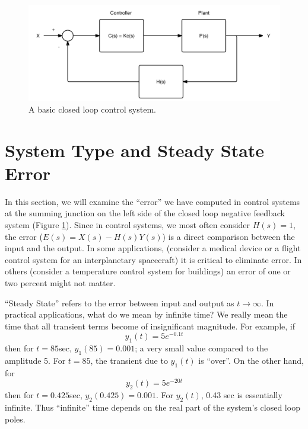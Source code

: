 \begin{figure}[b]\centering
\includegraphics[width=4.5in]{figs11/cl_rl_systema.png}	%
\caption{A basic closed loop control system.}\label{basicCLfig}
\end{figure}

%
%


\section{System Type and Steady State Error}

In this section, we will examine the ``error'' we have computed in control systems at the summing junction on the left side of the closed loop negative feedback system (Figure \ref{basicCLfig}).  Since in control systems, we most often consider $H(s) = 1$,  the error ($E(s) = X(s)-H(s)Y(s)$)
is a direct comparison between the input and the output.  In some applications, (consider a medical device or a flight control system for an interplanetary spacecraft) it is critical to eliminate error.  In others (consider a temperature control system for buildings) an error of one or two percent might not matter.

``Steady State'' refers to the error between input and output as $t\to\infty$.  In practical applications,
what do we mean by infinite time?
We really mean the time that all transient terms become of insignificant magnitude.   For example, if
\[
y_1(t) = 5e^{-0.1t}
\]
then for $t = 85$sec, $y_1(85) = 0.001$; a very small value compared to the amplitude 5.  For $t=85$,
the transient due to $y_1(t)$ is ``over''. On the other hand, for
\[
y_2(t) = 5e^{-20t}
\]
then for $t = 0.425$sec, $y_2(0.425) = 0.001$.   For $y_2(t)$,  0.43 sec is essentially infinite.
Thus ``infinite'' time depends on the real part of the system's closed loop poles.

